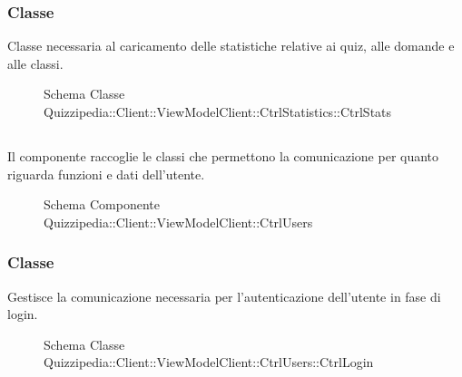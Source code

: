 \subsubsection{Classe }
Classe necessaria al caricamento delle statistiche relative ai quiz, alle domande e alle classi.
\begin{figure}[H]
\centering
\noindent{}
\caption[Schema Classe CtrlStats]{Schema Classe Quizzipedia::Client::ViewModelClient::CtrlStatistics::CtrlStats}
\end{figure}
\subsection{}
Il componente raccoglie le classi che permettono la comunicazione per quanto riguarda funzioni e dati dell'utente.
\begin{figure}[H]
\centering
\noindent{}
\caption[Schema Componente Quizzipedia::Client::ViewModelClient::CtrlUsers]{Schema Componente Quizzipedia::Client::ViewModelClient::CtrlUsers}
\end{figure}
\subsubsection{Classe }
Gestisce la comunicazione necessaria per l'autenticazione dell'utente in fase di login.
\begin{figure}[H]
\centering
\noindent{}
\caption[Schema Classe CtrlLogin]{Schema Classe Quizzipedia::Client::ViewModelClient::CtrlUsers::CtrlLogin}
\end{figure}

